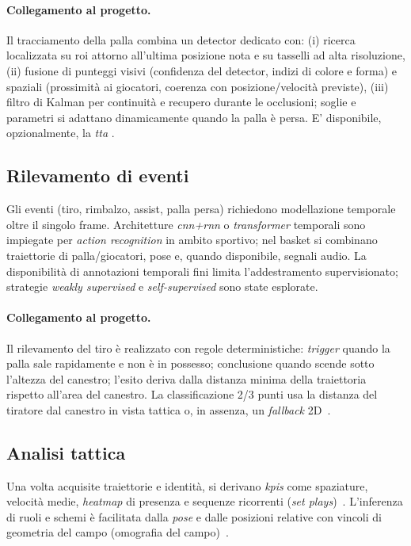 \documentclass[12pt,a4paper,openright,twoside]{book}
\begin{document}
\paragraph{Collegamento al progetto.} Il tracciamento della palla combina 
un detector dedicato con: (i) ricerca localizzata su \ac{roi} attorno 
all'ultima posizione nota e su tasselli ad alta risoluzione, (ii) fusione 
di punteggi visivi (confidenza del detector, indizi di colore e forma) e 
spaziali (prossimità ai giocatori, coerenza con posizione/velocità previste),
(iii) filtro di Kalman per continuità e recupero durante le occlusioni; 
soglie e parametri si adattano dinamicamente quando la palla è persa. 
E' disponibile, opzionalmente, la \emph{\ac{tta}} \cite{Kimura2024Understanding}.


\subsection{Rilevamento di eventi}
Gli eventi (tiro, rimbalzo, assist, palla persa) richiedono modellazione 
temporale oltre il singolo frame. Architetture \emph{\ac{cnn}+\ac{rnn}} 
o \emph{transformer} temporali sono impiegate per \emph{action recognition} 
\cite{Xiao2023Basketball} in ambito sportivo; nel basket si combinano 
traiettorie di palla/giocatori, pose e, quando disponibile, segnali audio. 
La disponibilità di annotazioni temporali fini limita l'addestramento 
supervisionato; strategie \emph{weakly supervised} \cite{Zhu2023Weaker} 
e \emph{self-supervised} \cite{Gui2023Survey} sono state esplorate.

\paragraph{Collegamento al progetto.} Il rilevamento del tiro è 
realizzato con regole deterministiche: \emph{trigger} quando la palla
sale rapidamente e non è in possesso; conclusione quando scende sotto 
l'altezza del canestro; l'esito deriva dalla distanza minima della 
traiettoria rispetto all'area del canestro. La classificazione 
2/3 punti usa la distanza del tiratore dal canestro in vista tattica o, 
in assenza, un \emph{fallback} 2D~\cite{White2020Analysis}.


\subsection{Analisi tattica}
Una volta acquisite traiettorie e identità, si derivano 
\emph{\ac{kpis}} come spaziature, velocità medie, \emph{heatmap} 
di presenza e sequenze ricorrenti (\emph{set plays})~\cite{Mikolajec2013Game}. 
L'inferenza di ruoli e schemi è facilitata dalla \emph{pose} 
e dalle posizioni relative con vincoli di geometria del campo
(omografia del campo)~\cite{Lingrui2025TacticExpert}.
\end{document}
